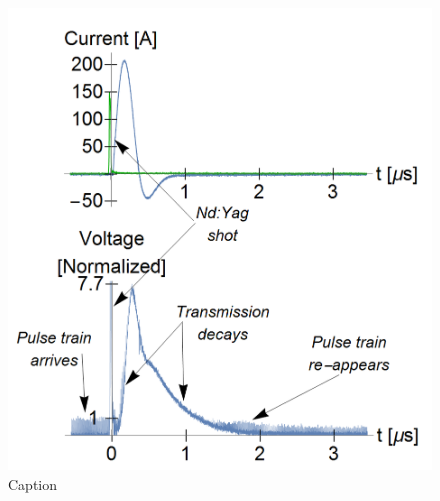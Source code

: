 \documentclass[../main.tex]{subfiles}
\begin{document}
\begin{figure}
    \centering
    \includegraphics[width=\textwidth]{figures/Curved capillaries/curved-pulsetrain-long.png}
    \caption{Caption}
    \label{fig:bump-longwindow}
\end{figure}
\end{document}
